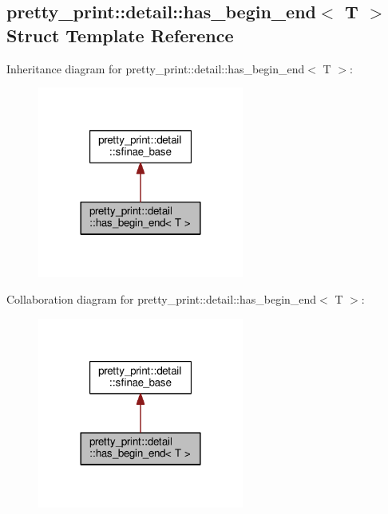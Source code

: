 \hypertarget{structpretty__print_1_1detail_1_1has__begin__end}{}\subsection{pretty\+\_\+print\+:\+:detail\+:\+:has\+\_\+begin\+\_\+end$<$ T $>$ Struct Template Reference}
\label{structpretty__print_1_1detail_1_1has__begin__end}


Inheritance diagram for pretty\+\_\+print\+:\+:detail\+:\+:has\+\_\+begin\+\_\+end$<$ T $>$\+:
\nopagebreak
\begin{figure}[H]
\begin{center}
\leavevmode
\includegraphics[width=192pt]{structpretty__print_1_1detail_1_1has__begin__end__inherit__graph}
\end{center}
\end{figure}


Collaboration diagram for pretty\+\_\+print\+:\+:detail\+:\+:has\+\_\+begin\+\_\+end$<$ T $>$\+:
\nopagebreak
\begin{figure}[H]
\begin{center}
\leavevmode
\includegraphics[width=192pt]{structpretty__print_1_1detail_1_1has__begin__end__coll__graph}
\end{center}
\end{figure}
